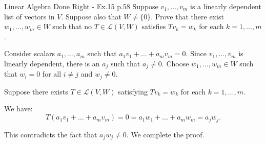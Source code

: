 \begin{problem}{}{}{Linear Algebra Done Right - Ex.15 p.58}
Suppose $v_1,\ldots,v_m$ is a linearly dependent list of vectors in $V$.
Suppose also that $W \ne \{0\}$. Prove that there exist
$w_1,\ldots,w_m \in W$ such that no $T \in \mathcal{L}(V,W)$
satisfies $Tv_k = w_k$ for each $k = 1,\ldots,m$.
\end{problem}

\begin{solution}
    Consider scalars $a_1, \dots, a_m$ such that
    $a_1 v_1 + \dots + a_m v_m = 0$. Since $v_1, \dots, v_m$ is linearly dependent,
    there is an $a_j$ such that $a_j \neq 0$. Choose $w_1, \dots, w_m \in W$ such that $w_i = 0$
    for all $i \neq j$ and $w_j \neq 0$.

    Suppose there exists $T \in \mathcal{L}(V, W)$ satisfying
    $T v_k = w_k$ for each $k = 1, \dots, m$.

    We have:
    \[
        T(a_1 v_1 + \dots + a_m v_m) = 0 = a_1 w_1 + \dots + a_m w_m = a_j w_j.
    \]

    This contradicts the fact that $a_j w_j \neq 0$.
    We complete the proof.
\end{solution}